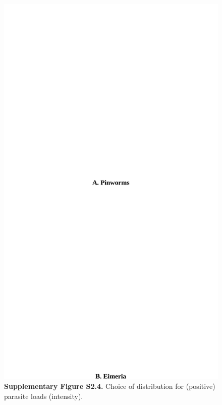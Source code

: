 \begin{figure}[H]
	\centering
	\includegraphics[width=0.9\linewidth,height=\textheight,keepaspectratio]{images/2article1/SupplementaryFigureS4.pdf}
	\captionsetup{labelformat=empty}
	\caption{\textbf{Supplementary Figure S2.4.} Choice of distribution for (positive) parasite loads (intensity).}
\end{figure}

\newpage

